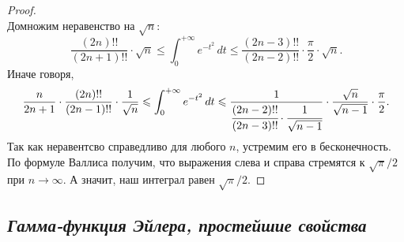 \begin{proof}
\[	\]
	Домножим неравенство на \(\sqrt{n}\): \[
	\frac{(2n)!!}{(2n + 1)!!} \cdot \sqrt{n} \leqslant \int_0^{+\infty} e^{-t^2} \, dt \leqslant \frac{(2n - 3)!!}{(2n - 2)!!} \cdot \frac{\pi}{2} \cdot \sqrt{n}.
	\]
	Иначе говоря, \[
	\frac{n}{2n + 1} \cdot \frac{(2n)!!}{(2n - 1)!!} \cdot \frac{1}{\sqrt{n}} \leqslant \int_0^{+\infty} e^{-t^2} \, dt \leqslant \frac{1}{\cfrac{(2n - 2)!!}{(2n - 3)!!} \cdot \cfrac{1}{\sqrt{n - 1}}} \cdot \frac{\sqrt{n}}{\sqrt{n - 1}}\cdot \frac{\pi}{2}.
	\]
	Так как неравентсво справедливо для любого \(n\), устремим его в бесконечность. По \hypertarget{wall}{формуле Валлиса} получим, что выражения слева и справа стремятся к \(\sqrt{\pi}/{2}\) при \(n \to \infty\). А значит, наш интеграл равен \(\sqrt{\pi}/{2}\).
\end{proof}

\subsection{\itshape Гамма-функция Эйлера, простейшие свойства}

